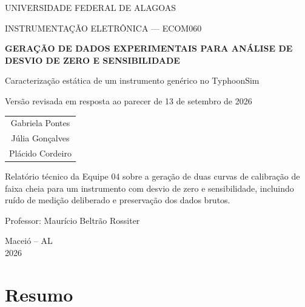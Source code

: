 \documentclass[12pt,a4paper]{article}
\begin{document}
\begin{titlepage}
  \thispagestyle{empty}
  \begin{center}
    {\large UNIVERSIDADE FEDERAL DE ALAGOAS\par}
    \vspace{0.25cm}
    {\large INSTRUMENTAÇÃO ELETRÔNICA --- ECOM060\par}

    \vfill

    {\Large\bfseries GERAÇÃO DE DADOS EXPERIMENTAIS PARA ANÁLISE DE DESVIO DE ZERO E SENSIBILIDADE\par}
    \vspace{0.55cm}
    {\large Caracterização estática de um instrumento genérico no TyphoonSim\par}
    \vspace{0.35cm}
    {\normalsize Versão revisada em resposta ao parecer de 13 de setembro de 2026\par}

    \vfill

    \begin{tabular}{c}
      Gabriela Pontes \\
      Júlia Gonçalves \\
      Plácido Cordeiro
    \end{tabular}

    \vfill

    \begin{minipage}{0.78\textwidth}
      \small
      Relatório técnico da Equipe 04 sobre a geração de duas curvas de calibração de faixa cheia para um instrumento com desvio de zero e sensibilidade, incluindo ruído de medição deliberado e preservação dos dados brutos.

      \vspace{0.45cm}
      Professor: Maurício Beltrão Rossiter
    \end{minipage}

    \vfill

    Maceió -- AL\\
    2026
  \end{center}
\end{titlepage}


\section*{Resumo}
\end{document}
